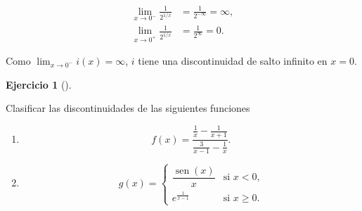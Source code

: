 \documentclass[
  a4paper,
]{scrreport}
\theoremstyle{definition}
\newtheorem{exercise}{Ejercicio}[chapter]
\theoremstyle{remark}
\begin{document}
\begin{tcolorbox}
\begin{enumerate}
  \begin{align*}
  \lim_{x\to 0^-} \frac{1}{2^{1/x}}
  &= \frac{1}{2^{-\infty}} 
  = \infty, \\
  \lim_{x\to 0^+} \frac{1}{2^{1/x}}
  &= \frac{1}{2^{\infty}} 
  = 0.
  \end{align*}

  Como \(\lim_{x\to 0^-} i(x)=\infty\), \(i\) tiene una discontinuidad
  de salto infinito en \(x=0\).
\end{enumerate}

\end{tcolorbox}

\begin{exercise}[]\protect\hypertarget{exr-clasificacion-dicontinuidades-2}{}\label{exr-clasificacion-dicontinuidades-2}

Clasificar las discontinuidades de las siguientes funciones

\begin{enumerate}
\def\labelenumi{\alph{enumi}.}
\item
  \[
  f(x)=\frac{\frac{1}{x}-\frac{1}{x+1}}{\frac{3}{x-1}-\frac{1}{x}}.
  \]
\item
  \[
  g(x)=
  \begin{cases}
  \dfrac{\operatorname{sen}(x)}{x} & \text{si $x<0$,} \\ 
  e^{\frac{1}{x-1}} & \text{si $x\geq 0$.}
  \end{cases}
  \]
\end{enumerate}

\end{exercise}
\end{document}
